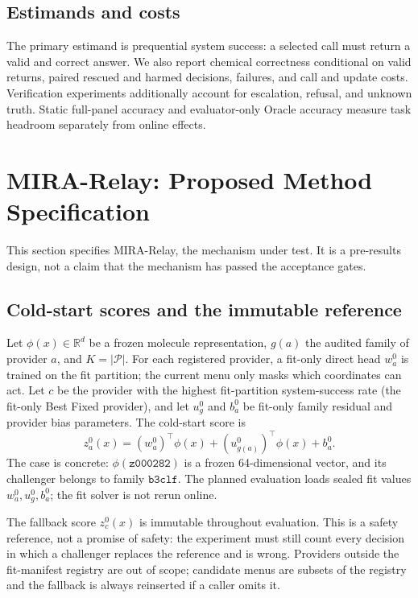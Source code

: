 \documentclass[sigconf,anonymous]{aamas}
\begin{document}
\subsection{Estimands and costs}
The primary estimand is prequential system success: a selected call must return a valid and correct answer. We also report chemical correctness conditional on valid returns, paired rescued and harmed decisions, failures, and call and update costs. Verification experiments additionally account for escalation, refusal, and unknown truth. Static full-panel accuracy and evaluator-only Oracle accuracy measure task headroom separately from online effects.

\section{MIRA-Relay: Proposed Method Specification}
This section specifies MIRA-Relay, the mechanism under test. It is a pre-results design, not a claim that the mechanism has passed the acceptance gates.

\subsection{Cold-start scores and the immutable reference}
Let $\phi(x)\in\mathbb{R}^{d}$ be a frozen molecule representation, $g(a)$ the audited family of provider $a$, and $K=|\mathcal P|$. For each registered provider, a fit-only direct head $w_a^0$ is trained on the fit partition; the current menu only masks which coordinates can act. Let $c$ be the provider with the highest fit-partition system-success rate (the fit-only Best Fixed provider), and let $u_g^0$ and $b_a^0$ be fit-only family residual and provider bias parameters. The cold-start score is
$$
z_a^0(x)=(w_a^0)^\top\phi(x)+(u_{g(a)}^0)^\top\phi(x)+b_a^0.
$$
The case is concrete: $\phi(\texttt{z000282})$ is a frozen 64-dimensional vector, and its challenger belongs to family $\texttt{b3clf}$. The planned evaluation loads sealed fit values $w_a^0,u_g^0,b_a^0$; the fit solver is not rerun online.

The fallback score $z_c^0(x)$ is immutable throughout evaluation. This is a safety reference, not a promise of safety: the experiment must still count every decision in which a challenger replaces the reference and is wrong. Providers outside the fit-manifest registry are out of scope; candidate menus are subsets of the registry and the fallback is always reinserted if a caller omits it.
\end{document}
